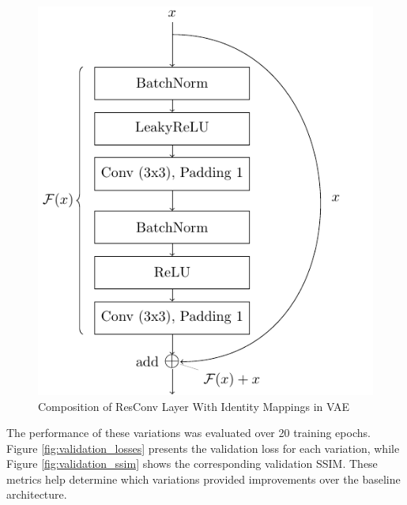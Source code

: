 \begin{figure}[htb]
    \centering
    \includegraphics[]{figures/model_architecture/build/residual_conv_with_im_layer.pdf}
    \caption{Composition of ResConv Layer With Identity Mappings in VAE \parencite{IdentityMappings}}
    \label{fig:identity_mappings}
\end{figure}

The performance of these variations was evaluated over 20 training epochs.
Figure \ref{fig:validation_losses} presents the validation loss for each variation, while Figure \ref{fig:validation_ssim} shows the corresponding validation \gls{SSIM}.
These metrics help determine which variations provided improvements over the baseline architecture.

